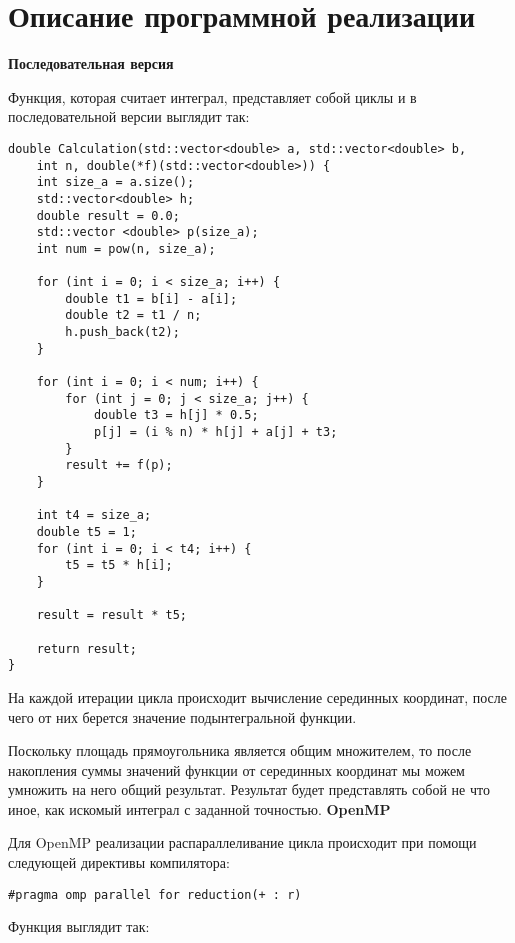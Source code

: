 \documentclass{report}
\begin{document}
\section*{Описание программной реализации}
\textbf{Последовательная версия}
\par Функция, которая считает интеграл, представляет собой циклы и в последовательной версии выглядит так:
\vspace{10pt}
\begin{lstlisting}
double Calculation(std::vector<double> a, std::vector<double> b,
    int n, double(*f)(std::vector<double>)) {
    int size_a = a.size();
    std::vector<double> h;
    double result = 0.0;
    std::vector <double> p(size_a);
    int num = pow(n, size_a);

    for (int i = 0; i < size_a; i++) {
        double t1 = b[i] - a[i];
        double t2 = t1 / n;
        h.push_back(t2);
    }

    for (int i = 0; i < num; i++) {
        for (int j = 0; j < size_a; j++) {
            double t3 = h[j] * 0.5;
            p[j] = (i % n) * h[j] + a[j] + t3;
        }
        result += f(p);
    }

    int t4 = size_a;
    double t5 = 1;
    for (int i = 0; i < t4; i++) {
        t5 = t5 * h[i];
    }

    result = result * t5;

    return result;
}
\end{lstlisting}
\par На каждой итерации цикла происходит вычисление серединных координат, после чего от них берется значение подынтегральной функции.
\par Поскольку площадь прямоугольника является общим множителем, то после накопления суммы значений функции от серединных координат мы можем умножить на него общий результат. Результат будет представлять собой не что иное, как искомый интеграл с заданной точностью.
\newpage
\textbf{OpenMP}
\par Для OpenMP реализации распараллеливание цикла происходит при помощи следующей директивы компилятора:
\vspace{10pt}
\begin{lstlisting}
#pragma omp parallel for reduction(+ : r)
\end{lstlisting}
\par Функция выглядит так:
\vspace{10pt}
\end{document}
